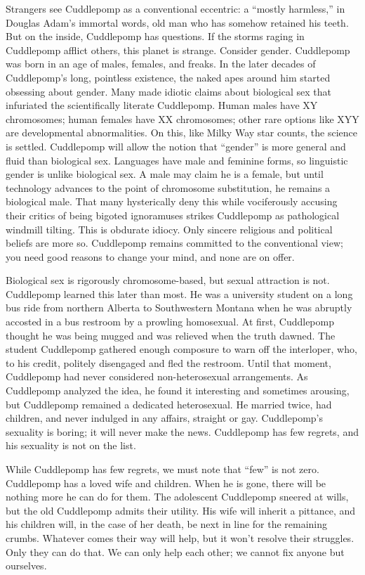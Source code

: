 Strangers see Cuddlepomp as a conventional eccentric: a ``mostly
harmless,'' in Douglas Adam's immortal words, old man who has somehow
retained his teeth. But on the inside, Cuddlepomp has questions. If the
storms raging in Cuddlepomp afflict others, this planet is strange.
Consider gender. Cuddlepomp was born in an age of males, females, and
freaks. In the later decades of Cuddlepomp's long, pointless existence,
the naked apes around him started obsessing about gender. Many made
idiotic claims about biological sex that infuriated the scientifically
literate Cuddlepomp. Human males have XY chromosomes; human females have
XX chromosomes; other rare options like XYY are developmental
abnormalities. On this, like Milky Way star counts, the science is
settled. Cuddlepomp will allow the notion that ``gender'' is more
general and fluid than biological sex. Languages have male and feminine
forms, so linguistic gender is unlike biological sex. A male may claim
he is a female, but until technology advances to the point of chromosome
substitution, he remains a biological male. That many hysterically deny
this while vociferously accusing their critics of being bigoted
ignoramuses strikes Cuddlepomp as pathological windmill tilting. This is
obdurate idiocy. Only sincere religious and political beliefs are more
so. Cuddlepomp remains committed to the conventional view; you need good
reasons to change your mind, and none are on offer.

Biological sex is rigorously chromosome-based, but sexual attraction is
not. Cuddlepomp learned this later than most. He was a university
student on a long bus ride from northern Alberta to Southwestern Montana
when he was abruptly accosted in a bus restroom by a prowling
homosexual. At first, Cuddlepomp thought he was being mugged and was
relieved when the truth dawned. The student Cuddlepomp gathered enough
composure to warn off the interloper, who, to his credit, politely
disengaged and fled the restroom. Until that moment, Cuddlepomp had
never considered non-heterosexual arrangements. As Cuddlepomp analyzed
the idea, he found it interesting and sometimes arousing, but Cuddlepomp
remained a dedicated heterosexual. He married twice, had children, and
never indulged in any affairs, straight or gay. Cuddlepomp's sexuality
is boring; it will never make the news. Cuddlepomp has few regrets, and
his sexuality is not on the list.

While Cuddlepomp has few regrets, we must note that ``few'' is not zero.
Cuddlepomp has a loved wife and children. When he is gone, there will be
nothing more he can do for them. The adolescent Cuddlepomp sneered at
wills, but the old Cuddlepomp admits their utility. His wife will
inherit a pittance, and his children will, in the case of her death, be
next in line for the remaining crumbs. Whatever comes their way will
help, but it won't resolve their struggles. Only they can do that. We
can only help each other; we cannot fix anyone but ourselves.

